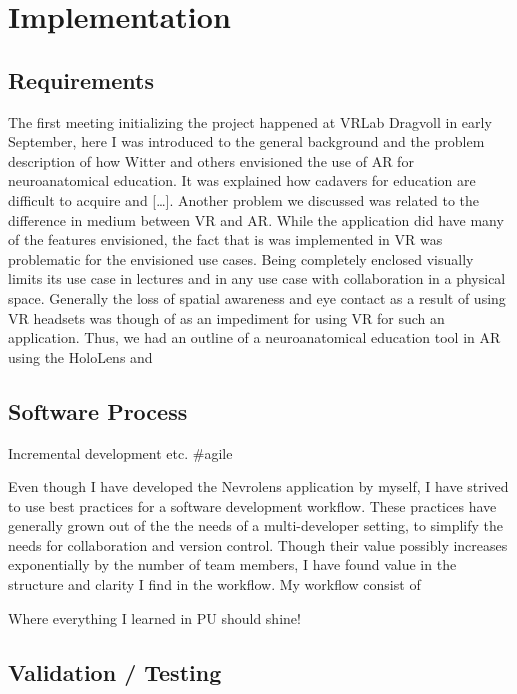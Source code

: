 


\chapter{Implementation}


\section{Requirements}

%
%


The first meeting initializing the project happened at VRLab Dragvoll in early September, here I was introduced to the general background and the problem description of how Witter and others envisioned the use of AR for neuroanatomical education. It was explained how cadavers for education are difficult to acquire and [\dots]. 
Another problem we discussed was related to the difference in medium between VR and AR. While the application  did have many of the features envisioned, the fact that is was implemented in VR was problematic for the envisioned use cases. Being completely enclosed visually limits its use case in lectures and in any use case with collaboration in a physical space. Generally the loss of spatial awareness and eye contact as a result of using VR headsets was though of as an impediment for using VR for such an application. 
Thus, we had an outline of a neuroanatomical education tool in AR using the HoloLens and 





\section{Software Process}
Incremental development etc. \#agile

Even though I have developed the Nevrolens application by myself, I have strived to use best practices for a software development workflow. These practices have generally grown out of the the needs of a multi-developer setting, to simplify the needs for collaboration and version control. Though their value possibly increases exponentially by the number of team members, I have found value in the structure and clarity I find in the workflow. 
My workflow consist of 



\large{Where everything I learned in PU should shine!}

\section{Validation / Testing}


